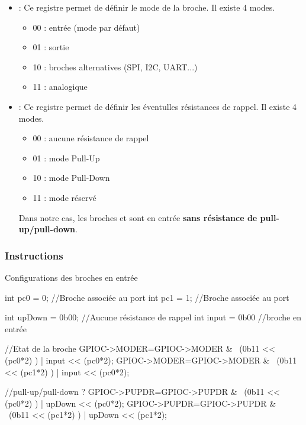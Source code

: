 \documentclass[12pt]{report}
\renewcommand{\bold}[1]{\textbf{#1}}
\begin{document}
\begin{itemize}

\item {} : Ce registre permet de définir le mode de la broche. Il existe 4 modes.

  \begin{itemize}
    \item 00 : entrée  (mode par défaut)
    \item 01 : sortie
    \item 10 : broches alternatives (SPI, I2C, UART...)
    \item 11 : analogique
  \end{itemize}

 \item {} : Ce registre permet de définir les éventulles résistances de rappel. Il existe 4 modes.

  \begin{itemize}
    \item 00 : aucune résistance de rappel
    \item 01 : mode Pull-Up
    \item 10 : mode Pull-Down
    \item 11 : mode réservé
  \end{itemize}

  Dans notre cas, les broches  et  sont en entrée \bold{sans résistance de pull-up/pull-down}.

\end{itemize}

\subsubsection{Instructions}

  \begin{Cpp}{Configurations des broches en entrée}

  int pc0 = 0;                //Broche associée au port
  int pc1 = 1;                //Broche associée au port

  int upDown = 0b00;   //Aucune résistance de rappel
  int input = 0b00     //broche en entrée

  //Etat de la broche
  GPIOC->MODER=GPIOC->MODER & ~(0b11 << (pc0*2) ) | input << (pc0*2); 
  GPIOC->MODER=GPIOC->MODER & ~(0b11 << (pc1*2) ) | input << (pc0*2);

  //pull-up/pull-down ?
  GPIOC->PUPDR=GPIOC->PUPDR & ~(0b11 << (pc0*2) ) | upDown << (pc0*2);
  GPIOC->PUPDR=GPIOC->PUPDR & ~(0b11 << (pc1*2) ) | upDown << (pc1*2);

\end{Cpp}
\end{document}
